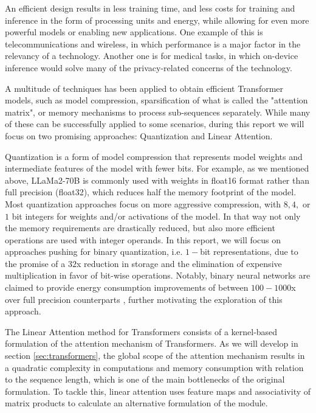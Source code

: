 An efficient design results in less training time, and less costs for training and inference in the form of processing units and energy, while allowing for even more powerful models or enabling new applications. One example of this is telecommunications and wireless, in which performance is a major factor in the relevancy of a technology. Another one is for medical tasks, in which on-device inference would solve many of the privacy-related concerns of the technology. 

A multitude of techniques has been applied to obtain efficient Transformer models, such as model compression, sparsification of what is called the "attention matrix", or memory mechanisms to process sub-sequences separately. While many of these can be successfully applied to some scenarios, during this report we will focus on two promising approaches: Quantization and Linear Attention.

Quantization is a form of model compression that represents model weights and intermediate features of the model with fewer bits. For example, as we mentioned above, LLaMa2-70B is commonly used with weights in float16 format rather than full precision (float32), which reduces half the memory footprint of the model. Most quantization approaches focus on more aggressive compression, with $8, 4,$ or $1$ bit integers for weights and/or activations of the model. In that way not only the memory requirements are drastically reduced, but also more efficient operations are used with integer operands. In this report, we will focus on approaches pushing for binary quantization, i.e. $1-$bit representations, due to the promise of a $32$x reduction in storage and the elimination of expensive multiplication in favor of bit-wise operations. Notably, binary neural networks are claimed to provide energy consumption improvements of between $100-1000$x over full precision counterparts \cite{energy7929192}, further motivating the exploration of this approach.

The Linear Attention method for Transformers consists of a kernel-based formulation of the attention mechanism of Transformers. As we will develop in section \ref{sec:transformers}, the global scope of the attention mechanism results in a quadratic complexity in computations and memory consumption with relation to the sequence length, which is one of the main bottlenecks of the original formulation. To tackle this, linear attention uses feature maps and associativity of matrix products to calculate an alternative formulation of the module.